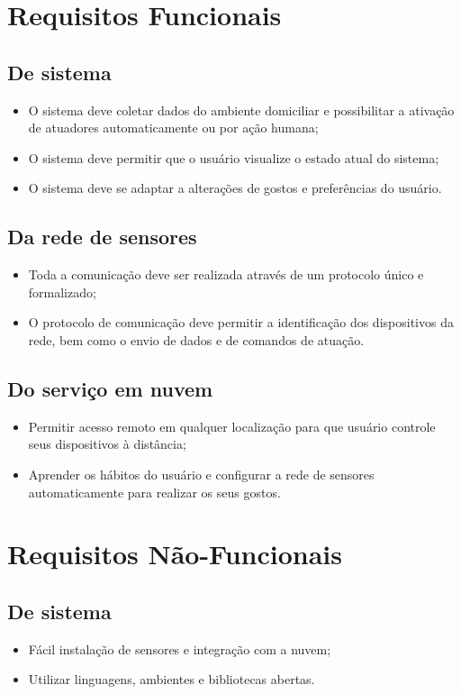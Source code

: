 \section{Requisitos Funcionais} \label{sec:reqfunc}
\subsection{De sistema}
\begin{itemize}
	\item O sistema deve coletar dados do ambiente domiciliar e possibilitar a ativação de atuadores automaticamente ou por ação humana;
	\item O sistema deve permitir que o usuário visualize o estado atual do sistema;
	\item O sistema deve se adaptar a alterações de gostos e preferências do usuário.
\end{itemize}

\subsection{Da rede de sensores}
\begin{itemize}
	\item Toda a comunicação deve ser realizada através de um protocolo único e formalizado;
	\item O protocolo de comunicação deve permitir a identificação dos dispositivos da rede, bem como o envio de dados e de comandos de atuação.
\end{itemize}

\subsection{Do serviço em nuvem}
\begin{itemize}
	\item Permitir acesso remoto em qualquer localização para que usuário controle seus dispositivos à distância;
	\item Aprender os hábitos do usuário e configurar a rede de sensores automaticamente para realizar os seus gostos.

\end{itemize}

\section{Requisitos Não-Funcionais} \label{sec:reqnfunc}
\subsection{De sistema}
\begin{itemize}
	\item Fácil instalação de sensores e integração com a nuvem;
	\item Utilizar linguagens, ambientes e bibliotecas abertas.
\end{itemize}

